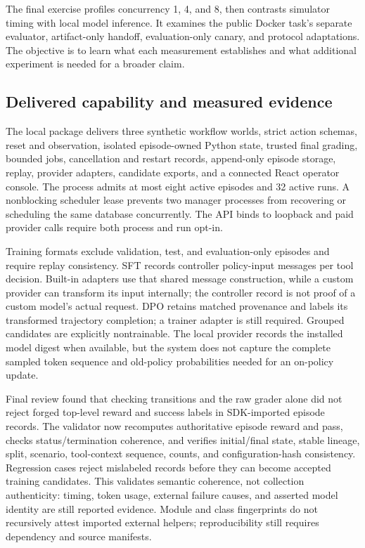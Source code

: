 \documentclass[
  11pt,
  letterpaper,
]{article}
\begin{document}
The final exercise profiles concurrency 1, 4, and 8, then contrasts
simulator timing with local model inference. It examines the public
Docker task's separate evaluator, artifact-only handoff, evaluation-only
canary, and protocol adaptations. The objective is to learn what each
measurement establishes and what additional experiment is needed for a
broader claim.

\subsection{Delivered capability and measured
evidence}\label{delivered-capability-and-measured-evidence}

The local package delivers three synthetic workflow worlds, strict
action schemas, reset and observation, isolated episode-owned Python
state, trusted final grading, bounded jobs, cancellation and restart
records, append-only episode storage, replay, provider adapters,
candidate exports, and a connected React operator console. The process
admits at most eight active episodes and 32 active runs. A nonblocking
scheduler lease prevents two manager processes from recovering or
scheduling the same database concurrently. The API binds to loopback and
paid provider calls require both process and run opt-in.

Training formats exclude validation, test, and evaluation-only episodes
and require replay consistency. SFT records controller policy-input
messages per tool decision. Built-in adapters use that shared message
construction, while a custom provider can transform its input
internally; the controller record is not proof of a custom model's
actual request. DPO retains matched provenance and labels its
transformed trajectory completion; a trainer adapter is still required.
Grouped candidates are explicitly nontrainable. The local provider
records the installed model digest when available, but the system does
not capture the complete sampled token sequence and old-policy
probabilities needed for an on-policy update.

Final review found that checking transitions and the raw grader alone
did not reject forged top-level reward and success labels in
SDK-imported episode records. The validator now recomputes authoritative
episode reward and pass, checks status/termination coherence, and
verifies initial/final state, stable lineage, split, scenario,
tool-context sequence, counts, and configuration-hash consistency.
Regression cases reject mislabeled records before they can become
accepted training candidates. This validates semantic coherence, not
collection authenticity: timing, token usage, external failure causes,
and asserted model identity are still reported evidence. Module and
class fingerprints do not recursively attest imported external helpers;
reproducibility still requires dependency and source manifests.
\end{document}
